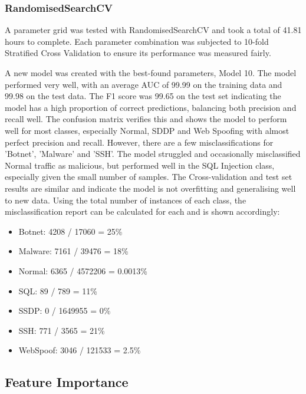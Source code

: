 \subsubsection*{RandomisedSearchCV}

\medskip

A parameter grid was tested with RandomisedSearchCV and took a total of 41.81 hours to complete. Each parameter combination was subjected to 10-fold Stratified Cross Validation to ensure its performance was measured fairly. 

A new model was created with the best-found parameters, Model 10. The model performed very well, with an average AUC of 99.99 on the training data and 99.98 on the test data. The F1 score was 99.65 on the test set indicating the model has a high proportion of correct predictions, balancing both precision and recall well. The confusion matrix verifies this and shows the model to perform well for most classes, especially Normal, SDDP and Web Spoofing with almost perfect precision and recall. However, there are a few misclassifications for 'Botnet', 'Malware' and 'SSH'. The model struggled and occasionally misclassified Normal traffic as malicious, but performed well in the SQL Injection class, especially given the small number of samples. The Cross-validation and test set results are similar and indicate the model is not overfitting and generalising well to new data. 
Using the total number of instances of each class, the misclassification report can be calculated for each and is shown accordingly:

\begin{itemize}
	\item Botnet: 4208 / 17060 = {\color{red} 25\%}
	\item Malware: 7161 / 39476 = 18\%
	\item Normal: 6365 / 4572206 = 0.0013\%
	\item SQL: 89 / 789 = 11\%
	\item SSDP: 0 / 1649955 = {\color{mygreen} 0\%}
	\item SSH: 771 / 3565 = 21\%
	\item WebSpoof: 3046 / 121533 = 2.5\%
\end{itemize}

\subsection*{Feature Importance}


